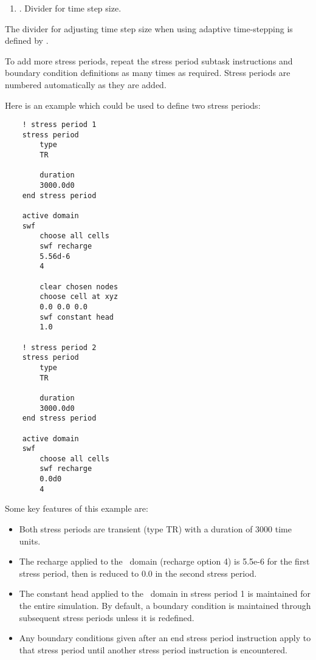     {
        \squish
        \begin{enumerate}
        \item {}.  Divider for time step size.
        \end{enumerate}
        The divider for adjusting time step size when using adaptive time-stepping is defined by .
    }

To add more stress periods, repeat the \textsf{stress period} subtask instructions and boundary condition definitions as many times as required.  Stress periods are numbered automatically as they are added.

Here is an example which could be used to define two stress periods:
\begin{verbatim}
    ! stress period 1
    stress period
        type
        TR

        duration
        3000.0d0
    end stress period

    active domain
    swf
        choose all cells
        swf recharge
        5.56d-6
        4

        clear chosen nodes
        choose cell at xyz
        0.0 0.0 0.0
        swf constant head
        1.0

    ! stress period 2
    stress period
        type
        TR

        duration
        3000.0d0
    end stress period

    active domain
    swf
        choose all cells
        swf recharge
        0.0d0
        4
\end{verbatim}

Some key features of this example are:
\begin{itemize}
    \item Both stress periods are transient (type TR) with a duration of 3000 time units.
    \item The recharge applied to the \swf\ domain (recharge option 4) is 5.5e-6 for the first stress period, then is reduced to 0.0 in the second stress period.
    \item The constant head applied to the \swf\ domain in stress period 1 is maintained for the entire simulation.  By default, a boundary condition is maintained through subsequent stress periods unless it is redefined.
    \item Any boundary conditions given after an \textsf{end stress period} instruction apply to that stress period until another \textsf{stress period} instruction is encountered.
\end{itemize}




